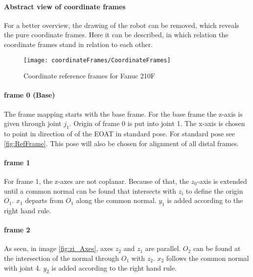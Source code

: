 \paragraph{Abstract view of coordinate frames}
For a better overview, the drawing of the robot can be removed, which reveals the pure coordinate frames. Here it can be described, in which relation the coordinate frames stand in relation to each other.

\begin{figure}[h]
	\texttt{[image: coordinateFrames/CoordinateFrames]}
	\caption{Coordinate reference frames for Fanuc 210F}
	\label{fig:RefFrameAbstract}
\end{figure}

\paragraph{frame 0 (Base)}
The frame mapping starts with the base frame. For the base frame the z-axis is given through joint $j_1$. Origin of frame 0 is put into joint 1.
The x-axis is chosen to point in direction of of the \ac{EOAT} in standard pose. For standard pose see \ref{fig:RefFrame}.
This pose will also be chosen for alignment of all distal frames.


\paragraph{frame 1}
For frame 1, the z-axes are not coplanar. 
Because of that, the  $z_0$-axis is extended until a common normal can be found that intersects with $z_i$ to define the origin $O_1$.
$x_1$ departs from $O_1$ along the common normal.
$y_1$ is added according to the right hand rule.

\paragraph{frame 2}
As seen, in image \ref{fig:zi_Axes}, axes $z_2$ and $z_1$ are parallel. $O_2$ can be found at the intersection of the normal through $O_1$ with $z_2$. $x_2$ follows the common normal with joint 4.
$y_2$ is added according to the right hand rule.

